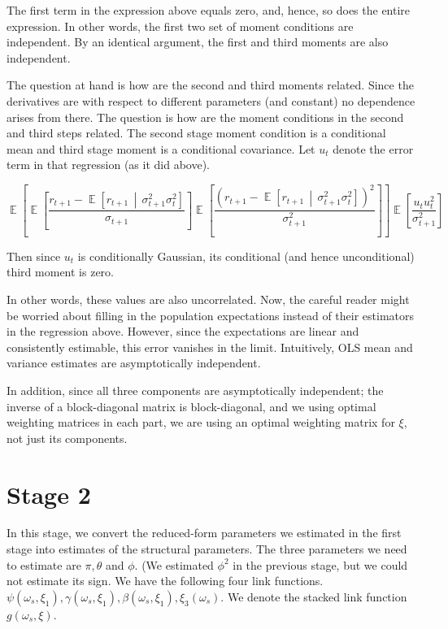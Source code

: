 \documentclass[11pt, letterpaper, twoside, final]{article}
\newcommand*{\mvert}{\,\middle\vert\,}
\DeclareMathOperator*{\E}{\mathbb{E}}
\begin{document}
The first term in the expression above equals zero, and, hence, so does the entire expression. 
In other words, the first two set of moment conditions are independent.
By an identical argument, the first and third moments are also independent.

The question at hand is how are the second and third moments related.
Since the derivatives are with respect to different parameters (and constant) no dependence arises from there.
The question is how are the moment conditions in the second and third steps related.
The second stage moment condition is a conditional mean and third stage moment is a conditional covariance.
Let $u_t$ denote the error term in that regression (as it did above).

\begin{equation}
    \E\left[\E\left[\frac{r_{t+1} - \E\left[r_{t+1}\mvert \sigma^2_{t+1} \sigma^2_t\right]}{\sigma_{t+1}} \right]
    \E\left[\frac{(r_{t+1} - \E\left[r_{t+1} \mvert \sigma^2_{t+1} \sigma^2_t\right])^2}{\sigma^2_{t+1}}\right]
    \right] 
%
    \E\left[\frac{u_t u_t^2}{\sigma^2_{t+1}}\right] 
\end{equation}

Then since $u_t$ is conditionally Gaussian, its conditional (and hence unconditional) third moment is zero.  

In other words, these values are also uncorrelated.
Now, the careful reader might be worried about filling in the population expectations instead of their estimators
in the regression above.
However, since the expectations are linear and consistently estimable, this error vanishes in the limit. 
Intuitively, OLS mean and variance estimates are asymptotically independent.

In addition, since all three components are asymptotically independent; the inverse of a block-diagonal matrix is
block-diagonal, and we using optimal weighting matrices in each part, we are using an
optimal weighting matrix for $\xi$, not just its components.


\section{Stage 2}

In this stage, we convert the reduced-form parameters we estimated in the first stage into estimates of the
structural parameters.
The three parameters we need to estimate are $\pi, \theta$ and $\phi$.
(We estimated $\phi^2$ in the previous stage, but we could not estimate its sign.
We have the following four link functions.
$\psi(\omega_s, \xi_1), \gamma(\omega_s, \xi_1), \beta(\omega_s, \xi_1), \xi_3(\omega_s)$.
We denote the stacked link function $g\left(\omega_s, \xi\right)$.
\end{document}

